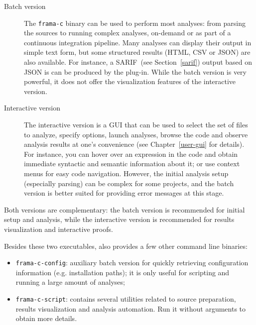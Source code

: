 \begin{description}
\item[Batch version]

  The \texttt{frama-c} binary can be used to perform most \FramaC analyses:
  from parsing the sources to running complex analyses, on-demand or as part
  of a continuous integration pipeline. Many analyses can display their output
  in simple text form, but some structured results (HTML, CSV or JSON) are
  also available. For instance, a SARIF~(see Section~\ref{sarif}) output
  based on JSON is can be produced by the  plug-in.
  While the batch version is very powerful, it does not offer the visualization
  features of the interactive version.

\item[Interactive version]
  The interactive version is a GUI that can be used to select the set of files
  to analyze, specify options, launch analyses, browse the code and observe
  analysis results at one's convenience (see Chapter~\ref{user-gui} for
  details). For instance, you can hover over an expression in the code and
  obtain immediate syntactic and semantic information about it; or use context
  menus for easy code navigation.
  However, the initial analysis setup (especially parsing) can be complex for
  some projects, and the batch version is better suited for providing error
  messages at this stage.

\end{description}

Both versions are complementary: the batch version is recommended
for initial setup and analysis, while the interactive version is recommended for
results visualization and interactive proofs.

Besides these two executables, \FramaC also provides a few other command line
binaries:
\begin{itemize}
\item \texttt{frama-c-config}: auxiliary batch version for
  quickly retrieving configuration information (e.g. installation paths);
  it is only useful for scripting and running a large amount of analyses;
\item \texttt{frama-c-script}: contains several
  utilities related to source preparation, results visualization and analysis
  automation. Run it without arguments to obtain more details.
\end{itemize}


